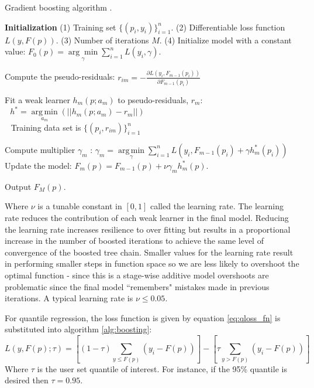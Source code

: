 \begin{algorithm}[H]
    \caption{Gradient boosting algorithm \cite{friedman2002}.}
    \begin{algorithmic}
    \STATE \textbf{Initialization} 
    \STATE (1) Training set $\{(p_i, y_i)\}_{i=1}^n$. 
    \STATE (2) Differentiable loss function $L(y, F(p))$. 
    \STATE (3) Number of iterations ${{M}}$.
    \STATE (4)   Initialize model with a constant value:
        $F_0(p) = \underset{\gamma}{\arg\min} \sum_{i=1}^n L(y_i, \gamma).$
    
        \STATE Compute the pseudo-residuals:  
            \STATE $r_{im} = -\frac{\partial L(y_i, F_{m-1}(p_i))}{\partial F_{m-1}(p_i)}$
        \ENDFOR
        
        \STATE Fit a weak learner $h_m(p; a_m)$ to pseudo-residuals, $r_{m}$: \\
            $\ \ \ h^* = \underset{a_m}{\operatorname{arg\,min}}(||h_m(p; a_m) - r_m||)$ \\
            $\ \ $ Training data set is $\{(p_i, r_{im})\}_{i=1}^n$ \;
        
        \STATE Compute multiplier $\gamma_m$ :
        $\gamma_m = \underset{\gamma}{\operatorname{arg\,min}} \sum_{i=1}^n L\left(y_i, F_{m-1}(p_i) + \gamma h^*_m(p_i)\right)$\;
        \STATE Update the model:
        $F_m(p) = F_{m-1}(p) + \nu \gamma_m h^*_m(p).$
    
    \ENDFOR
    \STATE Output $F_M(p).$
    \end{algorithmic}
\label{alg:boosting}
\end{algorithm}
Where $\nu$ is a tunable constant in $[0, 1]$ called the learning rate.  The learning rate reduces the contribution of each weak learner in the final model.  Reducing the learning rate increases resilience to over fitting but results in a proportional increase in the number of boosted iterations to achieve the same level of convergence of the boosted tree chain.  Smaller values for the learning rate result in performing smaller steps in function space so we are less likely to overshoot the optimal function - since this is a stage-wise additive model overshoots are problematic since the final model ``remembers" mistakes made in previous iterations.  A typical learning rate is $\nu\leq 0.05$.

For quantile regression, the loss function is given by equation \ref{eq:qloss_fn} is substituted into algorithm \ref{alg:boosting}:
\begin{equation}
L(y, F(p);\tau) = \left[ (1-\tau) \sum_{y \leq F(p)}( y_i - F(p) ) \right] - \left[ \tau \sum_{y > F(p)} (y_i - F(p)) \right]
\end{equation}
Where $\tau$ is the user set quantile of interest. For instance, if the 95\% quantile is desired then $\tau=0.95$.

